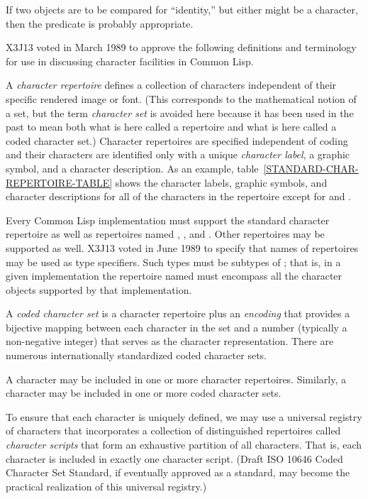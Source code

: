 If two objects are to be compared for ``identity,'' but either might be
a character, then the predicate  is probably appropriate.

\begin{newer}
X3J13 voted in March 1989 
to approve the following definitions and terminology for use in
discussing character facilities in Common Lisp.

A {\it character repertoire} defines a collection of characters
independent of their specific rendered image or font.  (This corresponds
to the mathematical notion of a set, but the term {\it character set}
is avoided here because it has been used in the past to mean
both what is here called a repertoire and what is here called a coded
character set.)
Character repertoires are specified independent of coding and their characters
are identified only with a unique {\it character label},
a graphic symbol, and a character description.
As an example, table~\ref{STANDARD-CHAR-REPERTOIRE-TABLE}
shows the character labels, graphic symbols, and character descriptions for
all of the characters in the repertoire 
except for  and .

Every Common Lisp implementation must support the standard character repertoire
as well as repertoires named , ,
and .  Other repertoires may be supported as well.
X3J13 voted in June 1989  to specify that names of
repertoires may be used as type specifiers.  Such types must be subtypes of ;
that is, in a given implementation
the repertoire named  must encompass all the character objects supported
by that implementation.

A {\it coded character set} is a character repertoire plus an {\it encoding}
that provides a bijective mapping between each character in the set and a number
(typically a non-negative integer)
that serves as the character representation.
There are numerous internationally standardized coded character sets.

A character may be included in one or more character repertoires.
Similarly, a character may be included in one or more coded character sets.

To ensure that each character is uniquely defined, we may use a universal registry of
characters that incorporates a collection of distinguished repertoires
called {\it character scripts} that form an exhaustive partition of all characters.
That is, each character is included in exactly one character script.
(Draft ISO 10646 Coded Character Set Standard, if eventually approved as a standard,
may become the practical realization of this universal registry.)


\end{newer}
